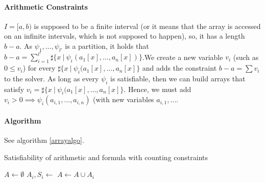 \documentclass[]{article}
\begin{document}
{{\paragraph{Arithmetic Constraints}\label{arithmetic-constraints}

$I = [a, b)$ is supposed to be a finite interval (or it means that the
array is accessed on an infinite intervals, which is not supposed to
happen), so, it has a length $b - a$. As $\psi_1, \ldots, \psi_{l'}$ is a
partition, it holds that
$b - a = \sum\limits_{i = 1}^{l'} \sharp\{x \ |\ \psi_i(a_1[x], \ldots, a_n[x])\}$.We
create a new variable $v_i$ (such as $0 \le v_i$) for every
$\sharp\{x\ |\ \psi_i(a_1[x], \ldots, a_n[x]\}$ and adds the constraint
$b - a = \sum v_i$ to the solver. As long as every $\psi_i$ is
satisfiable, then we can build arrays that satisfy
$v_i = \sharp\{x\ |\ \psi_i(a_1[x], \ldots, a_n[x]\}$. Hence, we must add
$v_i > 0 \implies \psi_i(a_{i, 1}, \ldots, a_{i, n})$ (with new variables
$a_{i, 1}, \ldots$.

\paragraph{Algorithm}\label{algorithm-1}

See algorithm \ref{arrayalgo}.

\begin{algorithm}[h]
\caption{Satisfiability of arithmetic and formula with counting constraints}
\begin{algorithmic}[1]
\State {}
    \State {}
    \State $A \gets \emptyset$
        \State $A_i, S_i \gets $ 
        \State $A \gets A \cup A_i$
    \EndFor
    \State {}
    \State {}
    \State {}
    \State {}
    \State {}
    \State {}
        \State {}
        \State {}
    \EndIf
    \State {}
    \State {}
\EndWhile
\State {}
\end{algorithmic}
\label{arrayalgo}
\end{algorithm}

}}
\end{document}
